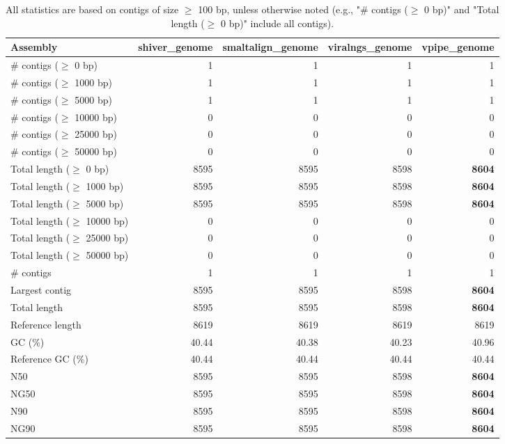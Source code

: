 \documentclass[12pt,a4paper]{article}
\begin{document}
\begin{table}[ht]
\begin{center}
\caption{All statistics are based on contigs of size $\geq$ 100 bp, unless otherwise noted (e.g., "\# contigs ($\geq$ 0 bp)" and "Total length ($\geq$ 0 bp)" include all contigs).}
\begin{tabular}{|l*{4}{|r}|}
\hline
Assembly & shiver\_genome & smaltalign\_genome & viralngs\_genome & vpipe\_genome \\ \hline
\# contigs ($\geq$ 0 bp) & 1 & 1 & 1 & 1 \\ \hline
\# contigs ($\geq$ 1000 bp) & 1 & 1 & 1 & 1 \\ \hline
\# contigs ($\geq$ 5000 bp) & 1 & 1 & 1 & 1 \\ \hline
\# contigs ($\geq$ 10000 bp) & 0 & 0 & 0 & 0 \\ \hline
\# contigs ($\geq$ 25000 bp) & 0 & 0 & 0 & 0 \\ \hline
\# contigs ($\geq$ 50000 bp) & 0 & 0 & 0 & 0 \\ \hline
Total length ($\geq$ 0 bp) & 8595 & 8595 & 8598 & {\bf 8604} \\ \hline
Total length ($\geq$ 1000 bp) & 8595 & 8595 & 8598 & {\bf 8604} \\ \hline
Total length ($\geq$ 5000 bp) & 8595 & 8595 & 8598 & {\bf 8604} \\ \hline
Total length ($\geq$ 10000 bp) & 0 & 0 & 0 & 0 \\ \hline
Total length ($\geq$ 25000 bp) & 0 & 0 & 0 & 0 \\ \hline
Total length ($\geq$ 50000 bp) & 0 & 0 & 0 & 0 \\ \hline
\# contigs & 1 & 1 & 1 & 1 \\ \hline
Largest contig & 8595 & 8595 & 8598 & {\bf 8604} \\ \hline
Total length & 8595 & 8595 & 8598 & {\bf 8604} \\ \hline
Reference length & 8619 & 8619 & 8619 & 8619 \\ \hline
GC (\%) & 40.44 & 40.38 & 40.23 & 40.96 \\ \hline
Reference GC (\%) & 40.44 & 40.44 & 40.44 & 40.44 \\ \hline
N50 & 8595 & 8595 & 8598 & {\bf 8604} \\ \hline
NG50 & 8595 & 8595 & 8598 & {\bf 8604} \\ \hline
N90 & 8595 & 8595 & 8598 & {\bf 8604} \\ \hline
NG90 & 8595 & 8595 & 8598 & {\bf 8604} \\ \hline

\end{tabular}
\end{center}
\end{table}
\end{document}
